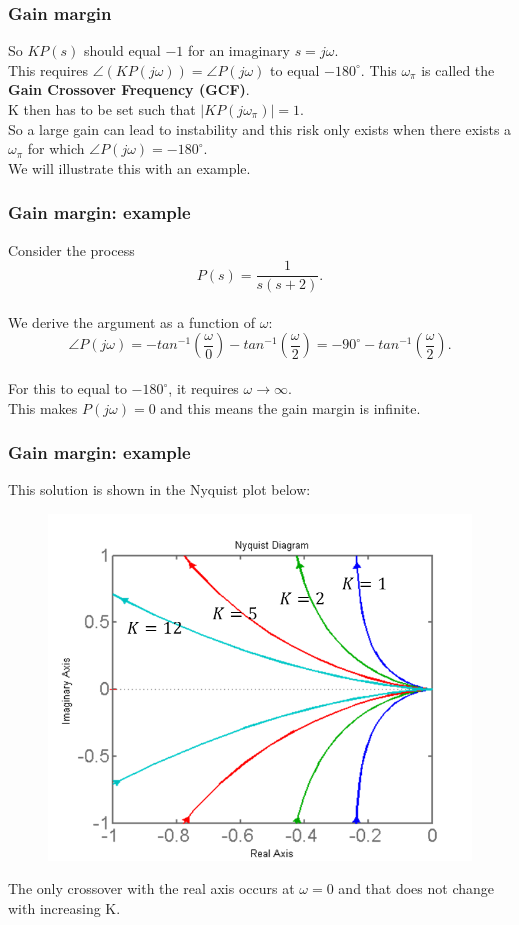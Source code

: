 \begin{frame}
	\frametitle{Gain margin}
	\vspace{-5ex}
	So $KP(s)$ should equal $-1$ for an imaginary $s=j\omega$.\\
	\bigskip
	This requires $\angle(KP(j\omega))=\angle P(j\omega)$ to equal $-180^{\circ}$. This $\omega_\pi$ is called the \textbf{Gain Crossover Frequency (GCF)}.\\
	K then has to be set such that $\big|KP(j\omega_\pi)\big|=1$.\\
	\bigskip
	So a large gain can lead to instability and this risk only exists when there exists a $\omega_\pi$ for which $\angle P(j\omega)=-180^{\circ}$.\\
	\medskip
	We will illustrate this with an example.
\end{frame}

\begin{frame}
	\frametitle{Gain margin: example}
	\vspace{-4ex}
	Consider the process $$P(s)=\frac{1}{s(s+2)}.$$\\
	We derive the argument as a function of $\omega$: $$\angle P(j\omega)=-tan^{-1}(\frac{\omega}{0})-tan^{-1}(\frac{\omega}{2})=-90^{\circ}-tan^{-1}(\frac{\omega}{2}).$$\\
	For this to equal to $-180^{\circ}$, it requires $\omega \rightarrow \infty$.\\ This makes $P(j\omega)=0$ and this means the gain margin is infinite.
\end{frame}

\begin{frame}
	\frametitle{Gain margin: example}
	This solution is shown in the Nyquist plot below:
	\vspace{-2ex}
	\begin{figure}
		\includegraphics[width=0.6\linewidth]{gain_example}
	\end{figure}
	\vspace{-2ex}
	The only crossover with the real axis occurs at $\omega=0$ and that does not change with increasing K.
\end{frame}

